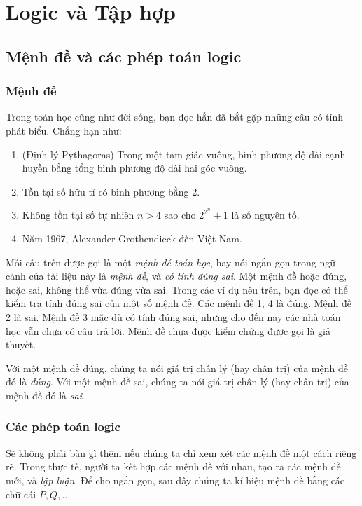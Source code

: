 \chapter{Logic và Tập hợp}\label{chapter:logic-and-set-theory}

\section{Mệnh đề và các phép toán logic}

\subsection*{Mệnh đề}

Trong toán học cũng như đời sống, bạn đọc hẳn đã bắt gặp những câu có tính phát biểu. Chẳng hạn như:

\begin{enumerate}[label={(\arabic*)}]
    \item (Định lý Pythagoras) Trong một tam giác vuông, bình phương độ dài cạnh huyền bằng tổng bình phương độ dài hai góc vuông.
    \item Tồn tại số hữu tỉ có bình phương bằng $2$.
    \item Không tồn tại số tự nhiên $n > 4$ sao cho $2^{2^{n}} + 1$ là số nguyên tố.
    \item Năm 1967, Alexander Grothendieck đến Việt Nam.
\end{enumerate}

Mỗi câu trên được gọi là một \textit{mệnh đề toán học}, hay nói ngắn gọn trong ngữ cảnh của tài liệu này là \textit{mệnh đề}, và \textit{có tính đúng sai}. Một mệnh đề hoặc đúng, hoặc sai, không thể vừa đúng vừa sai. Trong các ví dụ nêu trên, bạn đọc có thể kiểm tra tính đúng sai của một số mệnh đề. Các mệnh đề 1, 4 là đúng. Mệnh đề 2 là sai. Mệnh đề 3 mặc dù có tính đúng sai, nhưng cho đến nay các nhà toán học vẫn chưa có câu trả lời. Mệnh đề chưa được kiểm chứng được gọi là giả thuyết.

Với một mệnh đề đúng, chúng ta nói giá trị chân lý (hay chân trị) của mệnh đề đó là \textit{đúng}. Với một mệnh đề sai, chúng ta nói giá trị chân lý (hay chân trị) của mệnh đề đó là \textit{sai}.

\subsection*{Các phép toán logic}

Sẽ không phải bàn gì thêm nếu chúng ta chỉ xem xét các mệnh đề một cách riêng rẽ. Trong thực tế, người ta kết hợp các mệnh đề với nhau, tạo ra các mệnh đề mới, và \textit{lập luận}. Để cho ngắn gọn, sau đây chúng ta kí hiệu mệnh đề bằng các chữ cái $P, Q,\ldots$

